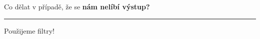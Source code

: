\documentclass{article}
\begin{document}
Co dělat v případě, že se {\bfseries nám nelíbí výstup?}
\hrule
Použijeme filtry!
\end{document}
